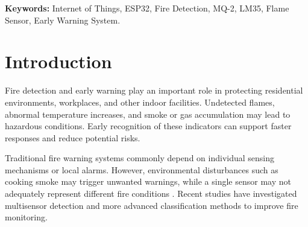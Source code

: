 \documentclass[12pt,a4paper]{article}
\begin{document}


\begin{abstract}
Fire incidents can cause significant damage to human life
and property when early warning mechanisms are unavailable
or ineffective. This project presents an ESP32-based fire
detection and warning prototype integrating an LM35
temperature sensor, an MQ-2 smoke/gas sensor, and a flame
sensor. The system employs a rule-based detection algorithm
to classify environmental conditions into three states:
SAFE, WARNING, and DANGER. Local feedback is provided
through an LCD1602 display, three status LEDs, and an
active buzzer. An SG90 servo motor simulates automatic
door opening during dangerous conditions, while a push
button supports manual door control when the system is
not in the DANGER state. The prototype was evaluated
using eight predefined functional test scenarios covering
sensor detection, state transitions, and door-control
behavior. All eight scenarios were reported as passing
during group testing. The current implementation operates
locally without cloud connectivity. Future development
may include remote monitoring, improved sensor
calibration, and false-alarm reduction techniques.
\end{abstract}

\noindent\textbf{Keywords:}
Internet of Things, ESP32, Fire Detection,
MQ-2, LM35, Flame Sensor, Early Warning System.

\section{Introduction}

Fire detection and early warning play an important role
in protecting residential environments, workplaces,
and other indoor facilities. Undetected flames, abnormal
temperature increases, and smoke or gas accumulation
may lead to hazardous conditions. Early recognition of
these indicators can support faster responses and
reduce potential risks.

Traditional fire warning systems commonly depend on
individual sensing mechanisms or local alarms.
However, environmental disturbances such as cooking
smoke may trigger unwanted warnings, while a single
sensor may not adequately represent different fire
conditions \cite{yu2023multidetector,fathoni2025multisensor}.
Recent studies have investigated multisensor detection
and more advanced classification methods to improve
fire monitoring.
\end{document}
